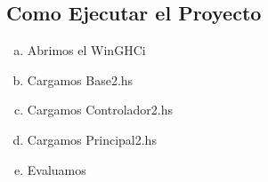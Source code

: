  \subsection{ Como Ejecutar el Proyecto}
\begin{enumerate}[a)]
     \item Abrimos el WinGHCi 
     \item Cargamos Base2.hs
    \item Cargamos Controlador2.hs
    \item Cargamos Principal2.hs
    \item Evaluamos
\end{enumerate}

\begin{figure}[ht!]

   \centering     %
   \hspace{0.1\linewidth}
   \\[20pt]
    

\end{figure}
